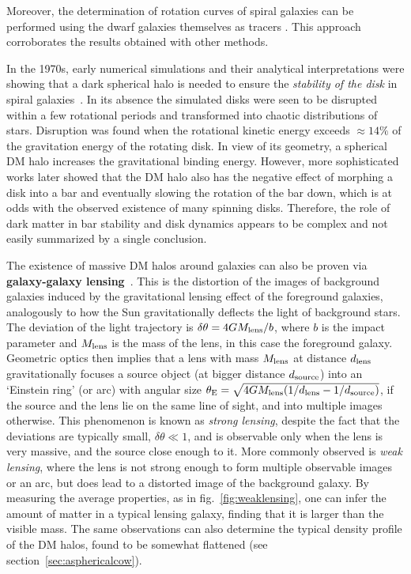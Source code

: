 \smallskip

Moreover, the determination of rotation curves of spiral galaxies can be performed using the dwarf galaxies themselves as tracers \cite{Zaritsky}. This approach corroborates the results obtained with other methods.

\smallskip

In the 1970s, early numerical simulations  and their analytical interpretations were showing that a dark spherical halo is needed to ensure 
the {\em stability of the disk} in spiral galaxies~\cite{disk_stability}. 
In its absence the simulated disks were seen to be disrupted within a few rotational periods and transformed into chaotic distributions of stars. 
Disruption was found  when the  rotational kinetic energy exceeds $\approx 14\%$ of the gravitation energy of the rotating disk.
In view of its geometry, a spherical DM halo increases the gravitational binding energy.
However, more sophisticated works  later showed that the DM halo also has the negative effect of morphing a disk into a bar and eventually 
slowing the rotation of the bar down, which is at odds with the observed existence of many spinning disks. 
Therefore, the role of dark matter in bar stability and disk dynamics appears to be complex and not easily summarized by a single conclusion.

\smallskip


The existence of massive DM halos around galaxies can also be proven via {\bf galaxy-galaxy lensing}~\cite{galaxy_galaxy_lensing}. 
This is the distortion of the images of background galaxies induced by the gravitational lensing effect of the foreground galaxies,
analogously to how the Sun gravitationally deflects the light of background stars. The deviation of the light trajectory is $\delta\theta=4GM_{\rm lens}/b$, where $b$ is the impact parameter and $M_{\rm lens}$ is the mass of the lens, in this case the foreground galaxy.
Geometric optics then implies that a lens with mass $M_{\rm lens}$ at distance $d_{\rm lens}$ gravitationally focuses a source object (at bigger distance $d_{\rm source}$)
into an `Einstein ring' (or arc) with angular size $\theta_{\rm E} = \sqrt{4GM_{\rm lens} (1/d_{\rm lens}-1/d_{\rm source})}$, if the source and the lens lie on the same line of sight, and into multiple images otherwise.
This phenomenon is known as {\em strong lensing}, despite the fact that the deviations are typically small, $\delta\theta\ll 1$, and is observable only when the lens is very massive, and the source close enough to it.
More commonly observed is {\em weak lensing}, where the lens is not strong enough to form multiple observable images or an arc, but does lead to a distorted image of the background galaxy.  
By measuring the average properties, as in fig.~\ref{fig:weaklensing},
one can infer the amount of matter in a typical lensing galaxy, finding that it is larger than the visible mass. 
The same observations can also determine the typical density profile of the DM halos, found to be somewhat flattened (see section~\ref{sec:asphericalcow}).  



